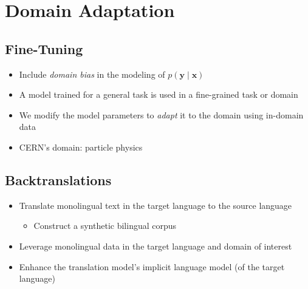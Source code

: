 \documentclass[landscape]{article}
\begin{document}

\cp
\section{Domain Adaptation}
\vspace*{10mm}
\subsection*{Fine-Tuning}
\vspace*{5mm}
\begin{itemize}\itemsep=5mm
	\item Include \textit{domain bias} in the modeling of $p(\mathbf{y} \mid \mathbf{x})$
	\item A model trained for a general task is used in a fine-grained task or domain
	\item We modify the model parameters to \textit{adapt} it to the domain using in-domain data
	\item CERN's domain: particle physics
\end{itemize}

\subsection*{Backtranslations}
\vspace*{5mm}
\begin{itemize}\itemsep=5mm
	\item Translate monolingual text in the target language to the source language
		\begin{itemize}
			\item Construct a synthetic bilingual corpus
		\end{itemize}
	\item Leverage monolingual data in the target language and domain of interest
	\item Enhance the translation model's implicit language model (of the target language)
\end{itemize}


\cp
\end{document}
